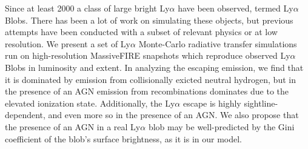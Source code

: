 Since at least 2000 a class of large bright Ly$\alpha$ have been observed, termed Ly$\alpha$ Blobs.
There has been a lot of work on simulating these objects, but previous attempts have been conducted with a subset of relevant physics or at low resolution.
We present a set of Ly$\alpha$ Monte-Carlo radiative transfer simulations run on high-resolution MassiveFIRE snapshots which reproduce observed Ly$\alpha$ Blobs in luminosity and extent.
In analyzing the escaping emission, we find that it is dominated by emission from collisionally exicted neutral hydrogen, but in the presence of an AGN emission from recombinations dominates due to the elevated ionization state.
Additionally, the Ly$\alpha$ escape is highly sightline-dependent, and even more so in the presence of an AGN.
We also propose that the presence of an AGN in a real Ly$\alpha$ blob may be well-predicted by the Gini coefficient of the blob's surface brightness, as it is in our model.
